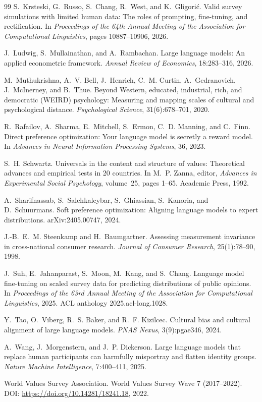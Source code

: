 \documentclass[10pt,letterpaper]{article}
\begin{document}
\begin{thebibliography}{99}
S.~Krsteski, G.~Russo, S.~Chang, R.~West, and K.~Gligori\'c.
\newblock Valid survey simulations with limited human data: The roles of prompting, fine-tuning, and rectification.
\newblock In \emph{Proceedings of the 64th Annual Meeting of the Association for Computational Linguistics}, pages 10887--10906, 2026.

J.~Ludwig, S.~Mullainathan, and A.~Rambachan.
\newblock Large language models: An applied econometric framework.
\newblock \emph{Annual Review of Economics}, 18:283--316, 2026.

M.~Muthukrishna, A.~V. Bell, J.~Henrich, C.~M. Curtin, A.~Gedranovich, J.~McInerney, and B.~Thue.
\newblock Beyond Western, educated, industrial, rich, and democratic (WEIRD) psychology: Measuring and mapping scales of cultural and psychological distance.
\newblock \emph{Psychological Science}, 31(6):678--701, 2020.

R.~Rafailov, A.~Sharma, E.~Mitchell, S.~Ermon, C.~D. Manning, and C.~Finn.
\newblock Direct preference optimization: Your language model is secretly a reward model.
\newblock In \emph{Advances in Neural Information Processing Systems}, 36, 2023.

S.~H. Schwartz.
\newblock Universals in the content and structure of values: Theoretical advances and empirical tests in 20 countries.
\newblock In M.~P. Zanna, editor, \emph{Advances in Experimental Social Psychology}, volume~25, pages 1--65. Academic Press, 1992.

A.~Sharifnassab, S.~Salehkaleybar, S.~Ghiassian, S.~Kanoria, and D.~Schuurmans.
\newblock Soft preference optimization: Aligning language models to expert distributions.
\newblock arXiv:2405.00747, 2024.

J.-B.~E.~M. Steenkamp and H.~Baumgartner.
\newblock Assessing measurement invariance in cross-national consumer research.
\newblock \emph{Journal of Consumer Research}, 25(1):78--90, 1998.

J.~Suh, E.~Jahanparast, S.~Moon, M.~Kang, and S.~Chang.
\newblock Language model fine-tuning on scaled survey data for predicting distributions of public opinions.
\newblock In \emph{Proceedings of the 63rd Annual Meeting of the Association for Computational Linguistics}, 2025. ACL anthology 2025.acl-long.1028.

Y.~Tao, O.~Viberg, R.~S. Baker, and R.~F. Kizilcec.
\newblock Cultural bias and cultural alignment of large language models.
\newblock \emph{PNAS Nexus}, 3(9):pgae346, 2024.

A.~Wang, J.~Morgenstern, and J.~P. Dickerson.
\newblock Large language models that replace human participants can harmfully misportray and flatten identity groups.
\newblock \emph{Nature Machine Intelligence}, 7:400--411, 2025.

World Values Survey Association.
\newblock World Values Survey Wave 7 (2017--2022).
\newblock DOI: \url{https://doi.org/10.14281/18241.18}, 2022.
\end{thebibliography}
\end{document}

